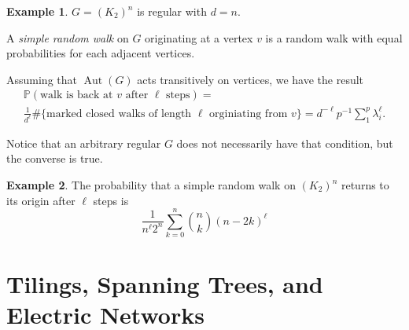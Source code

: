 \documentclass{report}
\newcommand{\matP}{\mathbb{P}}
\def \Aut {\operatorname{Aut}}
\theoremstyle{definition}
\newtheorem{example}{Example}[section]
\theoremstyle{remark}
\numberwithin{equation}{section}
\begin{document}
\begin{example}
$G = (K_2)^n$ is regular with $d = n.$
\end{example}

A \emph{simple random walk} on $G$ originating at a vertex $v$ is a random walk with equal probabilities for each adjacent vertices.

Assuming that $\Aut(G)$ acts transitively on vertices, we have the result
\begin{multline*}
    \matP\left(\text{walk is back at $v$ after $\ell$ steps}\right) = \\\frac{1}{d^\ell} \#\{\text{marked closed walks of length $\ell$ orginiating from $v$}\} 
    = d^{-\ell} p^{-1} \sum_1^p \lambda_i^\ell.
\end{multline*}


Notice that an arbitrary regular $G$ does not necessarily have that condition, but the converse is true.

\begin{example}
The probability that a simple random walk on $(K_2)^n$ returns to its origin after $\ell $ steps is
\[
\frac{1}{n^\ell 2^n} \sum_{k = 0}^n \binom{n}{k} (n - 2k)^\ell
\]
\end{example}


\chapter{Tilings, Spanning Trees, and Electric Networks}
\end{document}
